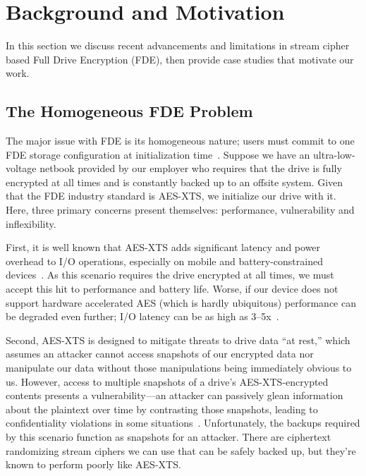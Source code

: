 \section{Background and Motivation}\label{sec:motivation}

In this section we discuss recent advancements and limitations in stream cipher
based Full Drive Encryption (FDE), then provide \numCases case studies that
motivate our work.


\subsection{The Homogeneous FDE Problem}

The major issue with FDE is its homogeneous nature; users must commit to one FDE
storage configuration at initialization time~\cite{dmcrypt}. Suppose we have an
ultra-low-voltage netbook provided by our employer who requires that the drive
is fully encrypted at all times and is constantly backed up to an offsite
system. Given that the FDE industry standard is AES-XTS, we initialize our drive
with it. Here, three primary concerns present themselves: performance,
vulnerability and inflexibility.

First, it is well known that AES-XTS adds significant latency and power overhead
to I/O operations, especially on mobile and battery-constrained
devices~\cite{google-engadget, android-M-mobile-motivation,
android-M-mobile-motivation-2}. As this scenario requires the drive encrypted at
all times, we must accept this hit to performance and battery life. Worse, if
our device does not support hardware accelerated AES (which is hardly
ubiquitous) performance can be degraded even further; I/O latency can be as high
as 3--5x~\cite{StrongBox}.

Second, AES-XTS is designed to mitigate threats to drive data ``at rest,'' which
assumes an attacker cannot access snapshots of our encrypted data nor manipulate
our data without those manipulations being immediately obvious to us. However,
access to multiple snapshots of a drive's AES-XTS-encrypted contents presents a
vulnerability---an attacker can passively glean information about the plaintext
over time by contrasting those snapshots, leading to confidentiality violations
in some situations~\cite{XEX, XTS}. Unfortunately, the backups required by this
scenario function as snapshots for an attacker. There are ciphertext randomizing
stream ciphers we can use that can be safely backed up, but they're known to
perform poorly like AES-XTS.

